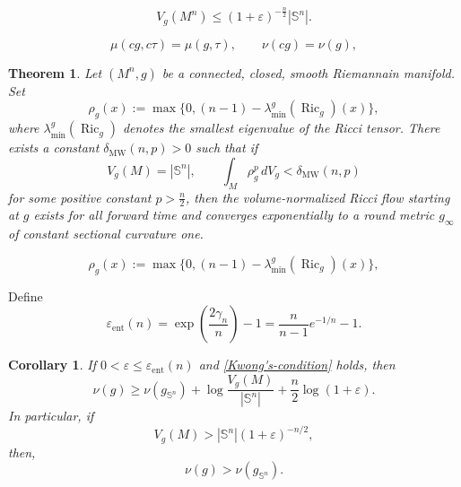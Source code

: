 \documentclass[10pt,a4paper]{amsart}
\newtheorem{theorem}{Theorem}
\newtheorem{corollary}{Corollary}
\newcommand{\MW}{\mathrm{MW}}
\DeclareMathOperator{\Ric}{Ric}
\newcommand{\Sph}{\mathbb S}
\newcommand{\ent}{\mathrm{ent}}
\newcommand{\eps}{\varepsilon}
\begin{document}
\begin{equation}\label{Bray's-conjecture}
     V_g(M^n) \leq (1 + \varepsilon)^{-\frac{n}{2}} |\mathbb{S}^n|.
\end{equation}

\begin{equation}\label{eq:scaling-mu}
\mu(cg,c\tau)=\mu(g,\tau),
\qquad
\nu(cg)=\nu(g),
\end{equation}

\begin{theorem}\label{thm:MaWang} 
Let $(M^n,g)$ be a connected, closed, smooth Riemannain manifold.
Set
\begin{equation}\label{eq:rho-def}
\rho_g(x):=\max\{0,(n-1)-\lambda_{\min}^g(\Ric_g)(x)\},
\end{equation}
where $\lambda_{\min}^g(\Ric_g)$ denotes  the smallest eigenvalue of the Ricci
tensor.  There exists a constant $\delta_{\MW}(n,p)>0$ such that  if 
\begin{equation}\label{eq:MW-hypothesis}
V_g(M)=|\Sph^n|,
\qquad
\int_M\rho_g^p\,dV_g<\delta_{\MW}(n,p)
\end{equation}
for some positive constant $p>\frac{n}{2}$, 
then the volume-normalized Ricci flow starting at $g$ exists for all forward time
and converges exponentially  to a round metric $g_\infty$
of constant sectional curvature one.
\end{theorem}

\begin{equation}
\rho_g(x):=\max\{0,(n-1)-\lambda_{\min}^g(\Ric_g)(x)\},
\end{equation}

Define \begin{equation}\label{eq:eps-ent}
\eps_{\ent}(n)
=\exp\left(\frac{2\gamma_n}{n}\right)-1
=\frac n{n-1}e^{-1/n}-1.
\end{equation}

\begin{corollary}
\label{cor:entropy-lower}
If $0<\eps\leq\eps_{\ent}(n)$ and \eqref{Kwong's-condition} holds, then
\begin{equation}\label{eq:entropy-sharp-factor}
\nu(g)\geq\nu(g_{\Sph^n})+\log\frac{V_g(M)}{|\Sph^n|}
+\frac n2\log(1+\eps).
\end{equation}
In particular, if
\begin{equation}\label{eq:volume-violation-entropy-0}
V_g(M)>|\Sph^n|(1+\eps)^{-n/2},
\end{equation}
then,
\begin{equation}\label{eq:volume-violation-entropy}
\nu(g)>\nu(g_{\Sph^n}).
\end{equation}
\end{corollary}
\end{document}
